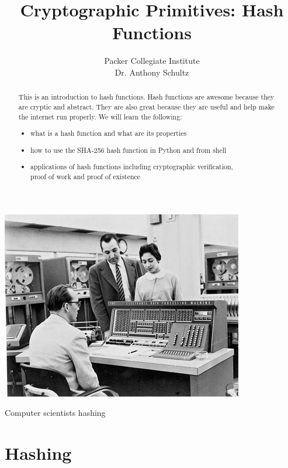 \documentclass{tufte-handout}
\title{Cryptographic Primitives: Hash Functions }
\author[Packer]{Packer Collegiate Institute\\Dr. Anthony Schultz}
\begin{document}
\maketitle%
\begin{marginfigure}[-50pt]%
  \includegraphics[width=\linewidth]{IBM.jpg}
  \caption{Computer scientists hashing }
  \label{fig:marginfig}
\end{marginfigure}
\begin{abstract}
\noindent
This is an introduction to hash functions.  Hash functions are awesome because they are cryptic and abstract.  They are also great because they are useful and help make the internet run properly.   We will learn the following: 
\begin{itemize}
\item what is a hash function and what are its properties
\item how to use the SHA-256 hash function in Python and from shell
 \item applications of hash functions including cryptographic verification, \\proof of work and proof of existence
 \end{itemize} \end{abstract}

\normalsize


\section{Hashing}
\end{document}
